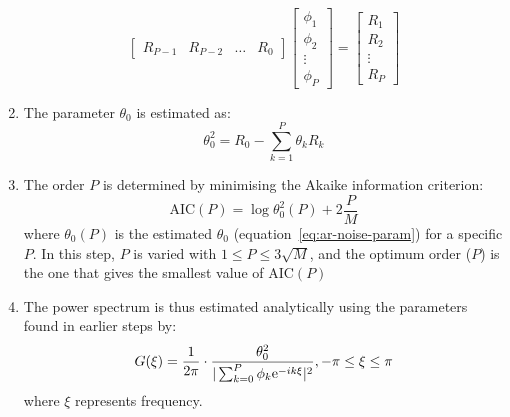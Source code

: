 \begin{enumerate}
\begin{equation}
\begin{bmatrix}
            R_{P-1} & R_{P-2} & \dots & R_{0}
          \end{bmatrix}
          \begin{bmatrix}
            \phi_{1} \\
            \phi_{2} \\
            \vdots \\
            \phi_{P}
          \end{bmatrix}
          =
          \begin{bmatrix}
            R_{1} \\
            R_{2} \\
            \vdots \\
            R_{P}
          \end{bmatrix}
        \end{equation}
  \item The parameter $\theta_{0}$ is estimated as:
        \begin{equation}
          \label{eq:ar-noise-param}
          \theta_{0}^{2} = R_{0} - \sum_{k=1}^{P}\theta_{k}R_{k}
        \end{equation}
  \item The order $P$ is determined by minimising the Akaike information criterion:
        \begin{equation}
          \label{eq:ar-aic}
          \mathrm{AIC}(P) = \log \theta_{0}^{2}(P) + 2 \frac{P}{M}
        \end{equation}
        where $\theta_{0}(P)$ is the estimated $\theta_{0}$ (equation~\ref{eq:ar-noise-param}) for a specific $P$.
        In this step, $P$ is varied with $1 \leq P \leq 3 \sqrt{M}$, and the optimum order ($P$) is the one that gives the smallest value of $\mathrm{AIC}(P)$
   \item The power spectrum is thus estimated analytically using the parameters found in earlier steps by:
        \begin{equation}
          \label{eq:ar-power-spectrum}
          G(\xi) = \frac{1}{2 \pi} \cdot \frac{\theta_{0}^{2}}{|\sum_{k=0}^{P}\phi_{k}\mathrm{e}^{-ik\xi}|^{2}}, -\pi \leq \xi \leq \pi
        \end{equation}
        where $\xi$ represents frequency.
\end{enumerate}




